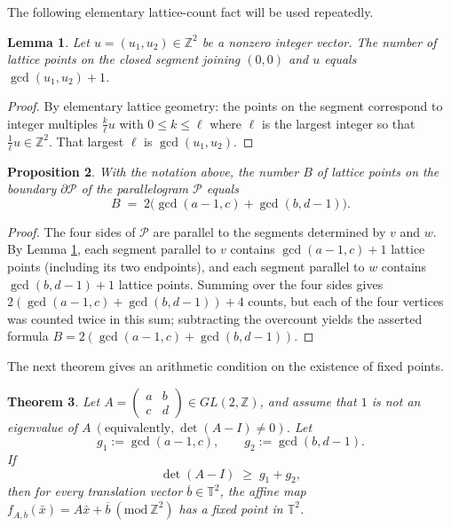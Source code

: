 \documentclass[12pt]{amsart}
\theoremstyle{plain}
\newtheorem{theorem}{Theorem}[section]
\newtheorem{lemma}[theorem]{Lemma}
\newtheorem{proposition}[theorem]{Proposition}
\theoremstyle{definition}
\theoremstyle{remark}
\begin{document}
The following elementary lattice-count fact will be used repeatedly.


\begin{lemma}\label{lem:segment-gcd}
Let $ u=(u_1,u_2)\in\mathbb Z^2$  be a nonzero integer vector. The number of lattice
points on the closed segment joining $ (0,0)$  and $ u$  equals $ \gcd(u_1,u_2)+1$.
\end{lemma}

\begin{proof}
By elementary lattice geometry: the points on the segment correspond to integer
multiples $ \frac{k}{\ell}u$  with $ 0\le k\le\ell$  where $ \ell$  is the largest
integer so that $ \frac{1}{\ell}u\in\mathbb Z^2$. That largest $ \ell$  is
$ \gcd(u_1,u_2)$.
\end{proof}

\begin{proposition}
\label{propb}
With the notation above, the number $ B$  of lattice points on the boundary
$ \partial\mathcal P$  of the parallelogram $ \mathcal P$  equals
$$
B \;=\; 2\big(\gcd(a-1,c)+\gcd(b,d-1)\big).
$$
\end{proposition}

\begin{proof}
The four sides of $ \mathcal P$  are parallel to the segments determined by
$ v$  and $ w$. By Lemma \ref{lem:segment-gcd}, each segment parallel to $ v$ 
contains $ \gcd(a-1,c)+1$  lattice points (including its two endpoints), and each
segment parallel to $ w$  contains $ \gcd(b,d-1)+1$  lattice points. Summing over
the four sides gives $ 2(\gcd(a-1,c)+\gcd(b,d-1))+4$  counts, but each of the
four vertices was counted twice in this sum; subtracting the overcount yields
the asserted formula $ B=2(\gcd(a-1,c)+\gcd(b,d-1))$.
\end{proof}



The next theorem gives an arithmetic condition on the existence of fixed points. 

\begin{theorem}\label{fixed-point}
Let $ A=\begin{pmatrix}a&b\\ c&d\end{pmatrix}\in GL(2,\mathbb Z)$, and assume
that $ 1$  is not an eigenvalue of $ A ~(\text{equivalently,}~ \det(A-I)\neq 0)$. Let
$$
g_1:=\gcd(a-1,c),\qquad g_2:=\gcd(b,d-1).
$$
If
\begin{equation}\label{eqarea}
\det(A-I) \;\ge\; g_1+g_2,
\end{equation}
then for every translation vector $ \overline{b}\in\mathbb T^2$,  the affine map
$ f_{A,\overline{b}}(\bar{x})=A\bar{x}+\overline{b}~(\text{mod}~\mathbb{Z}^2)$  has a fixed point in $ \mathbb T^2$.
\end{theorem}
\end{document}
